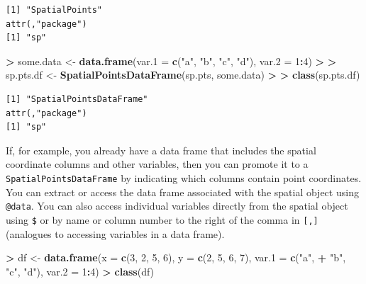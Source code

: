 \documentclass[]{krantz}
\makeatletter
\newenvironment{Shaded}{\begin{snugshade}}{\end{snugshade}}
\newcommand{\DataTypeTok}[1]{\textcolor[rgb]{0.27,0.27,0.27}{#1}}
\newcommand{\DecValTok}[1]{\textcolor[rgb]{0.06,0.06,0.06}{#1}}
\newcommand{\ErrorTok}[1]{\textcolor[rgb]{0.14,0.14,0.14}{\textbf{#1}}}
\newcommand{\KeywordTok}[1]{\textcolor[rgb]{0.27,0.27,0.27}{\textbf{#1}}}
\newcommand{\NormalTok}[1]{#1}
\newcommand{\OperatorTok}[1]{\textcolor[rgb]{0.43,0.43,0.43}{\textbf{#1}}}
\newcommand{\StringTok}[1]{\textcolor[rgb]{0.5,0.5,0.5}{#1}}
\newenvironment{kframe}{%
\medskip{}
\setlength{\fboxsep}{.8em}
 \def\at@end@of@kframe{}%
 \ifinner\ifhmode%
  \def\at@end@of@kframe{\end{minipage}}%
  \begin{minipage}{\columnwidth}%
 \fi\fi%
 \def\FrameCommand##1{\hskip\@totalleftmargin \hskip-\fboxsep
 \colorbox{shadecolor}{##1}\hskip-\fboxsep
     \hskip-\linewidth \hskip-\@totalleftmargin \hskip\columnwidth}%
 \MakeFramed {\advance\hsize-\width
   \@totalleftmargin\z@ \linewidth\hsize
   \@setminipage}}%
 {\par\unskip\endMakeFramed%
 \at@end@of@kframe}
\renewenvironment{Shaded}{\begin{kframe}}{\end{kframe}}
\makeatother
\begin{document}
\begin{verbatim}
[1] "SpatialPoints"
attr(,"package")
[1] "sp"
\end{verbatim}

\begin{Shaded}
\begin{Highlighting}[]
\OperatorTok{>}\StringTok{ }\NormalTok{some.data <-}\StringTok{ }\KeywordTok{data.frame}\NormalTok{(}\DataTypeTok{var.1 =} \KeywordTok{c}\NormalTok{(}\StringTok{"a"}\NormalTok{, }\StringTok{"b"}\NormalTok{, }\StringTok{"c"}\NormalTok{, }\StringTok{"d"}\NormalTok{), }\DataTypeTok{var.2 =} \DecValTok{1}\OperatorTok{:}\DecValTok{4}\NormalTok{)}
\OperatorTok{>}\StringTok{ }
\ErrorTok{>}\StringTok{ }\NormalTok{sp.pts.df <-}\StringTok{ }\KeywordTok{SpatialPointsDataFrame}\NormalTok{(sp.pts, some.data)}
\OperatorTok{>}\StringTok{ }
\ErrorTok{>}\StringTok{ }\KeywordTok{class}\NormalTok{(sp.pts.df)}
\end{Highlighting}
\end{Shaded}

\begin{verbatim}
[1] "SpatialPointsDataFrame"
attr(,"package")
[1] "sp"
\end{verbatim}

If, for example, you already have a data frame that includes the spatial coordinate columns and other variables, then you can promote it to a \texttt{SpatialPointsDataFrame} by indicating which columns contain point coordinates. You can extract or access the data frame associated with the spatial object using \texttt{@data}. You can also access individual variables directly from the spatial object using \texttt{\$} or by name or column number to the right of the comma in \texttt{{[},{]}} (analogues to accessing variables in a data frame).

\begin{Shaded}
\begin{Highlighting}[]
\OperatorTok{>}\StringTok{ }\NormalTok{df <-}\StringTok{ }\KeywordTok{data.frame}\NormalTok{(}\DataTypeTok{x =} \KeywordTok{c}\NormalTok{(}\DecValTok{3}\NormalTok{, }\DecValTok{2}\NormalTok{, }\DecValTok{5}\NormalTok{, }\DecValTok{6}\NormalTok{), }\DataTypeTok{y =} \KeywordTok{c}\NormalTok{(}\DecValTok{2}\NormalTok{, }\DecValTok{5}\NormalTok{, }\DecValTok{6}\NormalTok{, }\DecValTok{7}\NormalTok{), }\DataTypeTok{var.1 =} \KeywordTok{c}\NormalTok{(}\StringTok{"a"}\NormalTok{, }
\OperatorTok{+}\StringTok{   "b"}\NormalTok{, }\StringTok{"c"}\NormalTok{, }\StringTok{"d"}\NormalTok{), }\DataTypeTok{var.2 =} \DecValTok{1}\OperatorTok{:}\DecValTok{4}\NormalTok{)}
\OperatorTok{>}\StringTok{ }\KeywordTok{class}\NormalTok{(df)}
\end{Highlighting}
\end{Shaded}
\end{document}
